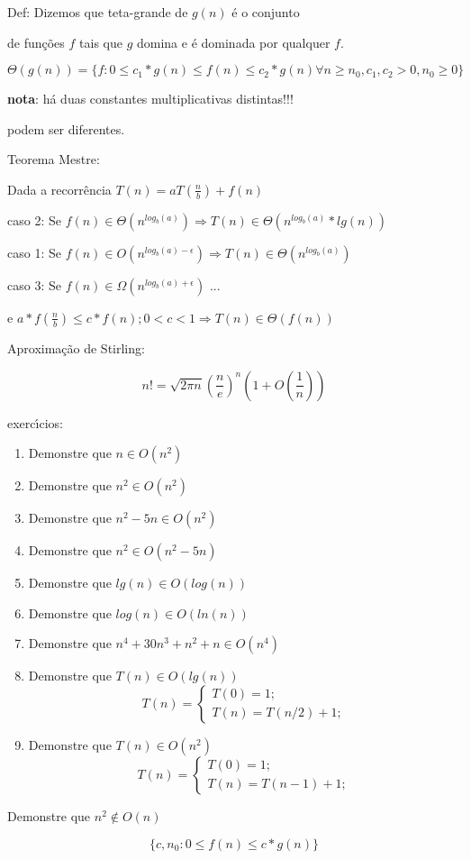 \documentclass{article}
\begin{document}
\begin {center}

Def: Dizemos que teta-grande de $g(n)$ \'{e} o conjunto

de fun\c{c}\~{o}es $f$ tais que $g$ domina e \'{e} dominada por qualquer $f$. 

\[\Theta(g(n))=\{f: 0 \leq c_{1}*g(n) \leq f(n) \leq c_{2}*g(n)  \forall n \geq n_0, c_{1}, c_{2}>0, n_0 \geq 0\}\]

{\bf nota}: h\'a duas constantes multiplicativas distintas!!! 

podem ser diferentes.

Teorema Mestre:

Dada a recorr\^encia $T(n)=aT(\frac{n}{b})+f(n)$

caso 2: Se $f(n) \in \Theta (n^{log_{b}(a)}) \Rightarrow T(n) \in \Theta(n^{log_{b}(a)}*lg(n))$

caso 1: Se $f(n) \in O (n^{log_{b}(a) - \epsilon}) \Rightarrow T(n) \in \Theta(n^{log_{b}(a)})$

caso 3: Se $f(n) \in \Omega (n^{log_{b}(a) + \epsilon})$ ...

e $a*f(\frac{n}{b}) \leq c*f(n); 0<c<1 \Rightarrow T(n) \in \Theta(f(n))$

Aproxima\c{c}\~ao de Stirling:

\[n!=\sqrt{2\pi n}(\frac{n}{e})^n(1+O(\frac{1}{n}))\]


\end {center}

\newpage
exerc\'{\i}cios:

\begin {enumerate}
\item Demonstre que $n \in O(n^2)$
\item Demonstre que $n^2 \in O(n^2)$
\item Demonstre que $n^2-5n \in O(n^2)$
\item Demonstre que $n^2 \in O(n^2-5n)$
\item Demonstre que $lg(n) \in O(log(n))$
\item Demonstre que $log(n) \in O(ln(n))$
\item Demonstre que $n^{4}+30n^{3}+n^{2}+n \in O(n^4)$
\item Demonstre que $T(n) \in O(lg(n))$
\[T(n)= \left \{ 
\begin{array}{l}
T(0)=1; \\
T(n)=T(n/2)+1;
\end {array} \right.
\]
\item Demonstre que $T(n) \in O(n^2)$
\[T(n)= \left \{ 
\begin{array}{l}
T(0)=1; \\
T(n)=T(n-1)+1;
\end {array} \right.
\]
\end{enumerate}
Demonstre que $n^2 \notin O(n)$

\[\{c, n_0 : 0 \leq f(n) \leq c*g(n) \}\]
\end{document}
